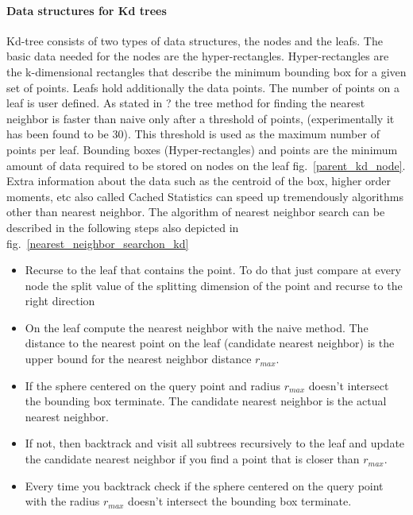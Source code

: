 \documentclass[12pt,letterpaper,doublespaced,ETD,dvips,proposal]{gtthesis}
\begin{document}
\begin{Body}
\paragraph{Data structures for Kd trees}

 Kd-tree consists of two types of data structures, the nodes and the
 leafs. The basic data needed for the nodes are the
 hyper-rectangles. Hyper-rectangles are the k-dimensional rectangles
 that describe the minimum bounding box  for a given set of points.
 Leafs hold additionally the data points. The number of points on a
 leaf is user defined. As stated in ? the tree method for finding the nearest neighbor is faster than naive
 only after a threshold of points, (experimentally it has been found
 to be 30). This threshold is used as the maximum number of points
 per leaf. Bounding boxes (Hyper-rectangles) and points are the minimum amount
 of data required to be stored on nodes on the leaf fig.~\ref{parent_kd_node}. Extra
 information about the data such as the centroid of the box, higher
 order moments, etc also called Cached Statistics can speed up
 tremendously algorithms other than nearest neighbor. The algorithm
 of nearest neighbor search can be described in the following steps
 also depicted in fig.~\ref{nearest_neighbor_searchon_kd}
 \begin{itemize}
   \item Recurse to the leaf that contains the point. To do that
   just compare at every node the split value of the splitting
   dimension of the point and recurse to the right direction
   \item On the leaf compute the nearest neighbor with the naive
   method. The distance to the nearest point on the leaf (candidate nearest neighbor)
   is the upper bound for the nearest neighbor distance $r_{max}$.
   \item If the sphere centered on the query point and radius
   $r_{max}$ doesn't intersect the bounding box terminate. The
   candidate nearest neighbor is the actual nearest neighbor.
   \item If not, then backtrack and visit all subtrees recursively
   to the leaf and update the candidate nearest neighbor if you find
   a point that is closer than $r_{max}$.
   \item Every time you backtrack check if the sphere centered on
   the query point with the radius $r_{max}$ doesn't intersect the
   bounding box terminate.

 \end{itemize}



\end{Body}
\end{document}

